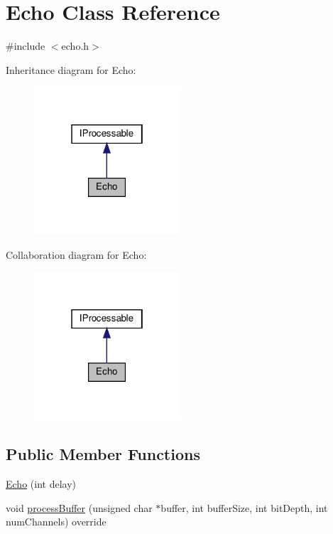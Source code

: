 \hypertarget{classEcho}{}\section{Echo Class Reference}
\label{classEcho}


{\ttfamily \#include $<$echo.\+h$>$}



Inheritance diagram for Echo\+:
\nopagebreak
\begin{figure}[H]
\begin{center}
\leavevmode
\includegraphics[width=154pt]{d1/dd3/classEcho__inherit__graph}
\end{center}
\end{figure}


Collaboration diagram for Echo\+:
\nopagebreak
\begin{figure}[H]
\begin{center}
\leavevmode
\includegraphics[width=154pt]{da/d44/classEcho__coll__graph}
\end{center}
\end{figure}
\subsection*{Public Member Functions}
\begin{DoxyCompactItemize}
\item 
\hyperlink{classEcho_a9531515ffab8be1e38cbdc0e0e9338a6}{Echo} (int delay)
\item 
void \hyperlink{classEcho_a1cdbe4bf78f5f6ac9b3609d9cd32de94}{process\+Buffer} (unsigned char $\ast$buffer, int buffer\+Size, int bit\+Depth, int num\+Channels) override
\end{DoxyCompactItemize}


